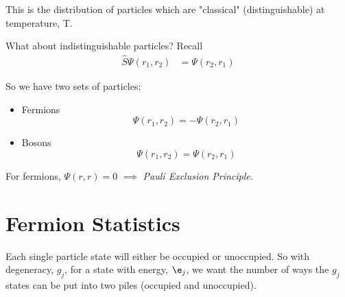 \documentclass[a4paper, 11pt, normalem]{report}
\begin{document}
This is the distribution of particles which are "classical" (distinguishable) at temperature, T. 

What about indistinguishable particles?
Recall
\begin{align}
    \hat{S}\Psi(r_1,r_2) &= \Psi(r_2,r_1) 
\end{align}

So we have two sets of particles:
\begin{itemize}
    \item Fermions
        \begin{equation}
            \Psi(r_1,r_2) = -\Psi(r_2,r_1)
        \end{equation}
    \item Bosons
        \begin{equation}
            \Psi(r_1,r_2) = \Psi(r_2,r_1)
        \end{equation}
\end{itemize}
For fermions, $\Psi(r,r) = 0$ $\implies$ \emph{Pauli Exclusion Principle.}

\section{Fermion Statistics}
Each single particle state will either be occupied or unoccupied. 
So with degeneracy, $g_j$, for a state with energy, $\e_j$, we want the number of ways the $g_j$ states can be put into two piles (occupied and unoccupied).
\end{document}
